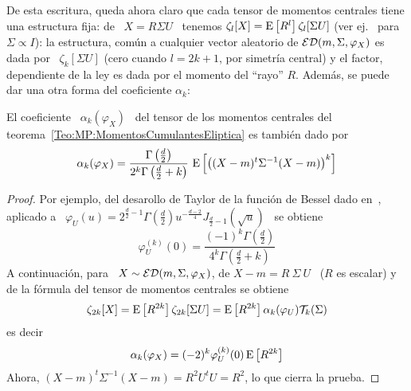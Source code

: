 De esta escritura, queda ahora claro que cada tensor de momentos centrales tiene
una estructura fija:  de \ $X =  R \Sigma U$ \ tenemos  $\zeta_l[X] = \operatorname{E}\left[
  R^l \right] \zeta_l[\Sigma U]$ (ver ej.~\cite[teo.~2.8]{FanKot90} para $\Sigma
\propto   I$):  la  estructura,   com\'un  a   cualquier  vector   aleatorio  de
$\mathcal{ED}(m,\Sigma,\varphi_X)$ es dada por \  $\zeta_k[\Sigma U]$ (cero cuando $l = 2
k + 1$, por  simetr\'ia central) y el factor, dependiente de  la ley es dada por
el  momento  del ``rayo''  $R$.   Adem\'as,  se puede  dar  una  otra forma  del
coeficiente $\alpha_k$:
%
\begin{lema}\label{Lem:MP:AlphaConR}
  El coeficiente \ $\alpha_k(\varphi_X)$ \  del tensor de los momentos centrales
  del teorema~\ref{Teo:MP:MomentosCumulantesEliptica} es tambi\'en dado por
  \[
  \alpha_k(\varphi_X) = \frac{\Gamma\left( \frac{d}{2} \right)}{2^k \Gamma\left(
      \frac{d}{2}  + k\right)}  \, \operatorname{E}\left[  \left( (X-m)^t  \Sigma^{-1} (X-m)
    \right)^k \right]
  \]
\end{lema}
%
\begin{proof}
  Por  ejemplo,  del  desarollo  de  Taylor  de  la  funci\'on  de  Bessel  dado
  en~\cite{GraRyz15},   aplicado   a   \   $\varphi_U(u)   =   2^{\frac{d}{2}-1}
  \Gamma\left(  \frac{d}{2} \right) u^{-\frac{d-2}{4}}  J_{\frac{d}{2}-1} \left(
    \sqrt{u} \right)$ \ se obtiene
  \[
  \varphi_U^{(k)}(0)   =  \frac{(-1)^k   \Gamma\left(   \frac{d}{2}  \right)}{4^k
  \Gamma\left( \frac{d}{2} + k\right)}
  \]
  A  continuaci\'on, para  \ $X  \sim \mathcal{ED}(m,\Sigma,\varphi_X)$,  de $X-m  =  R \
  \Sigma  \ U$  \ ($R$  es escalar)  y de  la f\'ormula  del tensor  de momentos
  centrales se obtiene
  \[
  \zeta_{2    k}[X]     =    \operatorname{E}\left[    R^{2     k}    \right]
  \zeta_{2   k}[\Sigma   U]   =   \operatorname{E}\left[  R^{2   k}   \right]
  \alpha_k(\varphi_U) \mathcal{T}_k(\Sigma)
  \]
  es decir
  \[
  \alpha_k(\varphi_X) = (-2)^k \varphi_U^{(k)}(0) \operatorname{E}\left[ R^{2 k} \right]
  \]
  Ahora, $(X-m)^t \Sigma^{-1} (X-m) = R^2 U^t U = R^2$, lo que cierra la prueba.
\end{proof}

